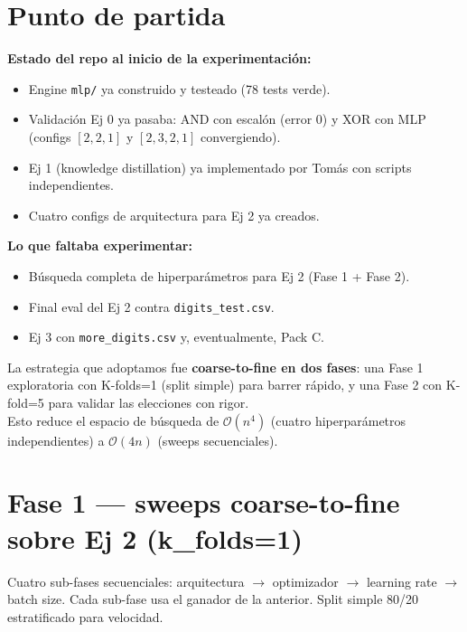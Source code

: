 \documentclass[11pt,a4paper]{article}
\newcommand{\code}[1]{\texttt{\textcolor{accent}{#1}}}
\begin{document}
\section{Punto de partida}

\textbf{Estado del repo al inicio de la experimentación:}
\begin{itemize}[leftmargin=1.4em, itemsep=2pt]
  \item Engine \code{mlp/} ya construido y testeado (78 tests verde).
  \item Validación Ej 0 ya pasaba: AND con escalón (error 0) y XOR con MLP (configs $[2,2,1]$ y $[2,3,2,1]$ convergiendo).
  \item Ej 1 (knowledge distillation) ya implementado por Tomás con scripts independientes.
  \item Cuatro configs de arquitectura para Ej 2 ya creados.
\end{itemize}

\textbf{Lo que faltaba experimentar:}
\begin{itemize}[leftmargin=1.4em, itemsep=2pt]
  \item Búsqueda completa de hiperparámetros para Ej 2 (Fase 1 + Fase 2).
  \item Final eval del Ej 2 contra \code{digits\_test.csv}.
  \item Ej 3 con \code{more\_digits.csv} y, eventualmente, Pack C.
\end{itemize}

\begin{aprendimos}
La estrategia que adoptamos fue \textbf{coarse-to-fine en dos fases}: una Fase 1 exploratoria con K-folds=1 (split simple) para barrer rápido, y una Fase 2 con K-fold=5 para validar las elecciones con rigor. \\[0.2em]
Esto reduce el espacio de búsqueda de $\mathcal{O}(n^4)$ (cuatro hiperparámetros independientes) a $\mathcal{O}(4n)$ (sweeps secuenciales).
\end{aprendimos}

\section{Fase 1 — sweeps coarse-to-fine sobre Ej 2 (k\_folds=1)}

Cuatro sub-fases secuenciales: arquitectura $\to$ optimizador $\to$ learning rate $\to$ batch size. Cada sub-fase usa el ganador de la anterior. Split simple 80/20 estratificado para velocidad.
\end{document}
